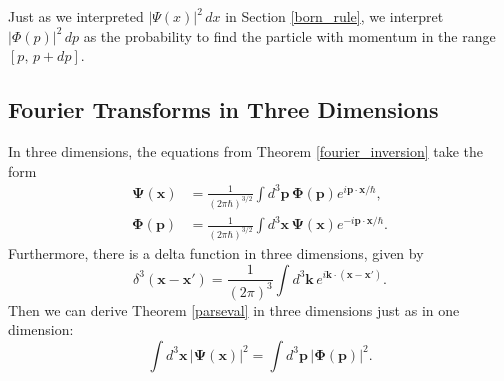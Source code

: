 Just as we interpreted $|\Psi(x)|^2\,dx$ in Section \ref{born_rule}, we interpret $|\Phi(p)|^2\,dp$ as the probability to find the particle with momentum in the range $[p,\,p+dp]$. 

\subsection{Fourier Transforms in Three Dimensions}\label{3d-fourier}


In three dimensions, the equations from Theorem \ref{fourier_inversion} take the form \begin{align*}\mathbf{\Psi}(\mathbf{x})&=\frac{1}{(2\pi\hbar)^{3/2}}\int d^3\mathbf{p}\,\mathbf{\Phi}(\mathbf{p})e^{i\mathbf{p}\cdot\mathbf{x}/\hbar},\\ \mathbf{\Phi}(\mathbf{p})&=\frac{1}{(2\pi\hbar)^{3/2}}\int d^3\mathbf{x}\,\mathbf{\Psi}(\mathbf{x})e^{-i\mathbf{p}\cdot\mathbf{x}/\hbar}.\end{align*}Furthermore, there is a delta function in three dimensions, given by $$\delta^3(\mathbf{x}-\mathbf{x}')=\frac{1}{(2\pi)^3}\int d^3\mathbf{k}\,e^{i\mathbf{k}\cdot(\mathbf{x}-\mathbf{x'})}.$$Then we can derive Theorem \ref{parseval} in three dimensions just as in one dimension: $$\int d^3\mathbf{x}\,|\mathbf{\Psi}(\mathbf{x})|^2=\int d^3\mathbf{p}\,|\mathbf{\Phi}(\mathbf{p})|^2.$$
